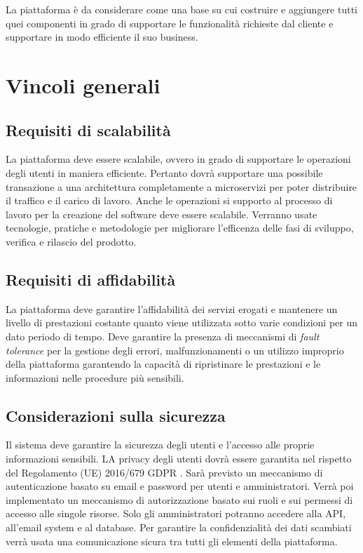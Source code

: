 La piattaforma è da considerare come una base su cui costruire e aggiungere tutti quei componenti in grado di supportare le funzionalità richieste dal cliente e supportare
in modo efficiente il suo business.


\section{Vincoli generali}
\subsection{Requisiti di scalabilità}
La piattaforma deve essere scalabile, ovvero in grado di supportare le operazioni degli utenti
in maniera efficiente.
Pertanto dovrà supportare una possibile transazione a una architettura completamente a microservizi per poter distribuire il traffico e
il carico di lavoro.
Anche le operazioni si supporto al processo di lavoro per la creazione del software deve essere scalabile.
Verranno usate tecnologie, pratiche e metodologie per migliorare l'efficenza delle fasi di sviluppo, verifica e rilascio del prodotto.

\subsection{Requisiti di affidabilità}
La piattaforma deve garantire l'affidabilità dei servizi erogati e mantenere un livello di prestazioni
costante quanto viene utilizzata sotto varie condizioni per un dato periodo di tempo.
Deve garantire la presenza di meccanismi di \textit{fault tolerance} per la gestione degli errori, malfunzionamenti o un utilizzo improprio della piattaforma
garantendo la capacità di ripristinare le prestazioni e le informazioni nelle procedure più sensibili.

\subsection{Considerazioni sulla sicurezza}
Il sistema deve garantire la sicurezza degli utenti e l’accesso alle proprie informazioni sensibili.
LA privacy degli utenti dovrà essere garantita nel rispetto del Regolamento (UE) 2016/679 GDPR \cite{gdpr}.
Sarà previsto un meccanismo di autenticazione basato su email e password per utenti e amministratori.
Verrà poi implementato un meccanismo di autorizzazione basato sui ruoli e sui permessi di accesso alle singole risorse.
Solo gli amministratori potranno accedere alla API, all’email system e al database.
Per garantire la confidenzialità dei dati scambiati verrà usata una comunicazione sicura tra tutti gli elementi della piattaforma.

